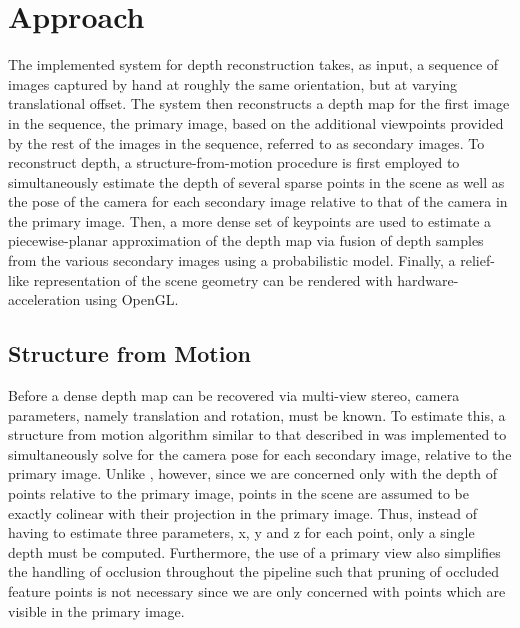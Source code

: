 \documentclass[conference]{acmsiggraph}
\begin{document}

\section{Approach}

The implemented system for depth reconstruction takes, as input, a sequence
of images captured by hand at roughly the same orientation, but at varying
translational offset.  The system then reconstructs a depth map for the
first image in the sequence, the primary image, based on the additional
viewpoints provided by the rest of the images in the sequence,
referred to as secondary images.
To reconstruct depth, a structure-from-motion
procedure is first employed to simultaneously estimate the depth of several
sparse points in the scene as well as the pose of the camera
for each secondary image relative to that of the camera in the primary image.
Then, a more dense set of keypoints are used to 
estimate a piecewise-planar approximation of the depth map
via fusion of depth samples from the various secondary images using
a probabilistic model.
Finally, a relief-like representation of the scene geometry can be rendered
with hardware-acceleration using OpenGL.




\subsection{Structure from Motion}

Before a dense depth map can be recovered via multi-view stereo,
camera parameters, namely translation and rotation, must be known.
To estimate this, a structure from motion algorithm similar to that
described in \cite{snavely2006photo} was implemented to
simultaneously solve for the camera pose for each secondary image,
relative to the primary image.
Unlike \cite{snavely2006photo}, however, since we are concerned
only with the depth of points relative to the primary image,
points in the scene are assumed to be exactly colinear with
their projection in the primary image.  Thus, instead of having
to estimate three parameters, x, y and z for each point,
only a single depth must be computed.  Furthermore, the use
of a primary view also simplifies the handling of occlusion throughout
the pipeline such that pruning of occluded feature points
is not necessary since we are only concerned with points which
are visible in the primary image.
\end{document}
